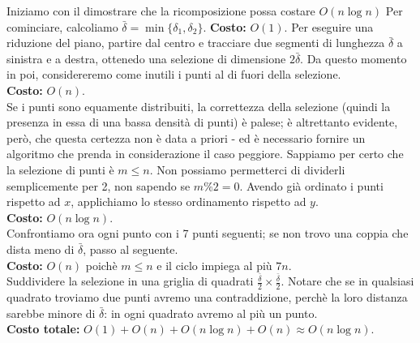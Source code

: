 Iniziamo con il dimostrare che la ricomposizione possa costare $ O(n\log{n}) $
Per cominciare, calcoliamo $ \bar{\delta} = \min\{\delta_1, \delta_2\}$.
\textbf{Costo:} $ O(1) $.
Per eseguire una riduzione del piano, partire dal centro e tracciare due segmenti di lunghezza $ \bar{\delta} $ a sinistra e a destra, ottenedo una selezione di dimensione $ 2\bar{\delta} $. Da questo momento in poi, considereremo come inutili i punti al di fuori della selezione.\\
\textbf{Costo:} $ O(n) $.\\
Se i punti sono equamente distribuiti, la correttezza della selezione (quindi la presenza in essa di una bassa densità di punti) è palese; è altrettanto evidente, però, che questa certezza non è data a priori - ed è necessario fornire un algoritmo che prenda in considerazione il caso peggiore.%
Sappiamo per certo che la selezione di punti è $ m \le n $. Non possiamo permetterci di dividerli semplicemente per 2, non sapendo se $ m \% 2 = 0 $.
Avendo già ordinato i punti rispetto ad $ x $, applichiamo lo stesso ordinamento rispetto ad $ y $.\\
\textbf{Costo:} $ O(n \log{n}) $.\\
Confrontiamo ora ogni punto con i 7 punti seguenti; se non trovo una coppia che dista meno di $ \bar{\delta} $, passo al seguente.\\
\textbf{Costo: } $ O(n) $ poichè $ m \le n $ e il ciclo impiega al più $ 7n $.\\
Suddividere la selezione in una griglia di quadrati $ \frac{\bar{\delta}}{2} \times \frac{\bar{\delta}}{2}$. Notare che se in qualsiasi quadrato troviamo due punti avremo una contraddizione, perchè la loro distanza sarebbe minore di $ \bar{\delta} $: in ogni quadrato avremo al più un punto.\\ %
\textbf{Costo totale:} $ O(1) + O(n) + O(n \log{n}) + O(n) \approx O(n \log{n})$. %

